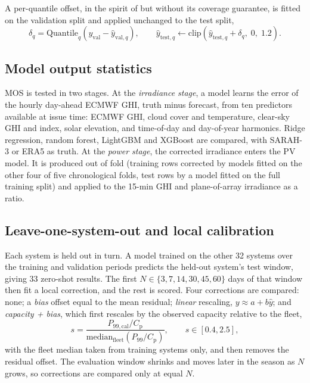 A per-quantile offset, in the spirit of \citet{Romano2019} but without its coverage guarantee, is fitted on the validation split and applied unchanged to the test split,
\begin{equation}
\delta_q = \mathrm{Quantile}_q\!\left(y_\mathrm{val} - \hat{y}_{\mathrm{val},q}\right), \qquad \hat{y}_{\mathrm{test},q} \leftarrow \mathrm{clip}\!\left(\hat{y}_{\mathrm{test},q} + \delta_q,\; 0,\; 1.2\right).
\end{equation}

\subsection{Model output statistics}
\label{sec:meth-mos}

MOS is tested in two stages. At the \emph{irradiance stage}, a model learns the error of the hourly day-ahead ECMWF GHI, truth minus forecast, from ten predictors available at issue time: ECMWF GHI, cloud cover and temperature, clear-sky GHI and index, solar elevation, and time-of-day and day-of-year harmonics. Ridge regression, random forest, LightGBM and XGBoost are compared, with SARAH-3 or ERA5 as truth. At the \emph{power stage}, the corrected irradiance enters the PV model. It is produced out of fold (training rows corrected by models fitted on the other four of five chronological folds, test rows by a model fitted on the full training split) and applied to the 15-min GHI and plane-of-array irradiance as a ratio.

\subsection{Leave-one-system-out and local calibration}
\label{sec:meth-loso}

Each system is held out in turn. A model trained on the other 32 systems over the training and validation periods predicts the held-out system's test window, giving 33 zero-shot results. The first $N \in \{3, 7, 14, 30, 45, 60\}$ days of that window then fit a local correction, and the rest is scored. Four corrections are compared: none; a \emph{bias} offset equal to the mean residual; \emph{linear} rescaling, $y \approx a + b\hat{y}$; and \emph{capacity + bias}, which first rescales by the observed capacity relative to the fleet,
\begin{equation}
s = \frac{P_{99,\mathrm{cal}} / C_\mathrm{p}}{\mathrm{median}_\mathrm{fleet}\left(P_{99} / C_\mathrm{p}\right)}, \qquad s \in [0.4, 2.5],
\end{equation}
with the fleet median taken from training systems only, and then removes the residual offset. The evaluation window shrinks and moves later in the season as $N$ grows, so corrections are compared only at equal $N$.

